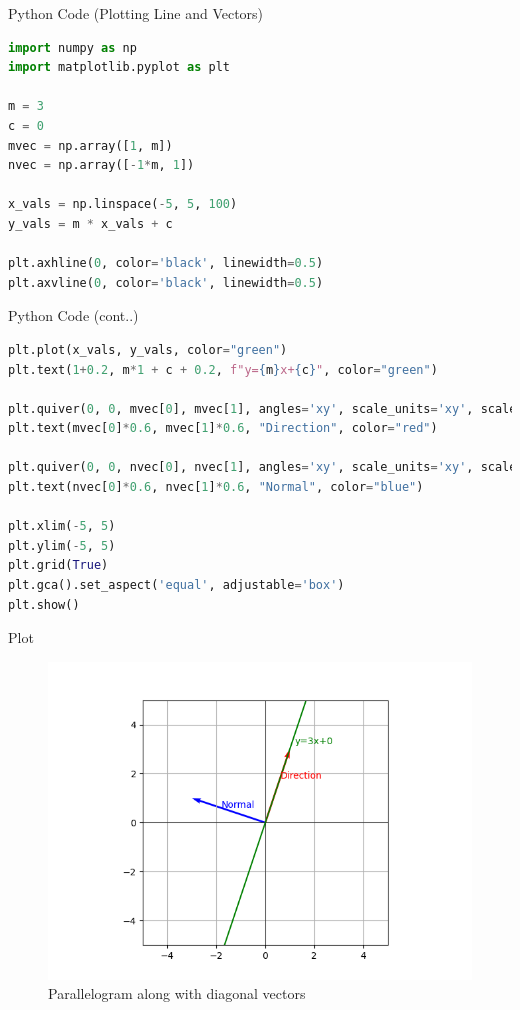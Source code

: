 \documentclass{beamer}
\begin{document}
\begin{frame}[fragile]{Python Code (Plotting Line and Vectors)}
\begin{lstlisting}[language=Python]
import numpy as np
import matplotlib.pyplot as plt

m = 3
c = 0
mvec = np.array([1, m])
nvec = np.array([-1*m, 1])

x_vals = np.linspace(-5, 5, 100)
y_vals = m * x_vals + c

plt.axhline(0, color='black', linewidth=0.5)
plt.axvline(0, color='black', linewidth=0.5)
\end{lstlisting}
\end{frame}

\begin{frame}[fragile]{Python Code (cont..)}
\begin{lstlisting}[language=Python]
plt.plot(x_vals, y_vals, color="green")
plt.text(1+0.2, m*1 + c + 0.2, f"y={m}x+{c}", color="green")

plt.quiver(0, 0, mvec[0], mvec[1], angles='xy', scale_units='xy', scale=1, color='red')
plt.text(mvec[0]*0.6, mvec[1]*0.6, "Direction", color="red")

plt.quiver(0, 0, nvec[0], nvec[1], angles='xy', scale_units='xy', scale=1, color='blue')
plt.text(nvec[0]*0.6, nvec[1]*0.6, "Normal", color="blue")

plt.xlim(-5, 5)
plt.ylim(-5, 5)
plt.grid(True)
plt.gca().set_aspect('equal', adjustable='box')
plt.show()
\end{lstlisting}
\end{frame}

\begin{frame}[fragile]{Plot}
\begin{figure}[H]\centering
\includegraphics[width=1\columnwidth]{figs/plt.png}
\caption{Parallelogram along with diagonal vectors}
\label{fig:plt}
\end{figure}
\end{frame}
\end{document}
